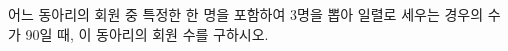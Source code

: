 \hspace*{2mm}\begin{minipage}[t]{\dimexpr\linewidth-2mm\relax}\vspace{0pt}
어느 동아리의 회원 중 특정한 한 명을 포함하여 3명을 뽑아 일렬로 세우는 경우의 수가 90일 때, 이 동아리의 회원 수를 구하시오.\end{minipage}
